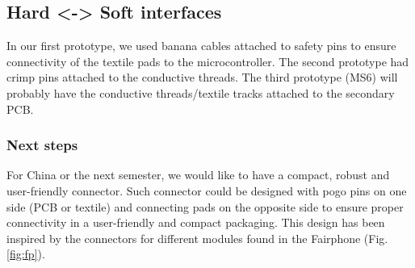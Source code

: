 \subsection{Hard <-> Soft interfaces}
In our first prototype, we used banana cables attached to safety pins to ensure connectivity of the textile pads to the microcontroller. The second prototype had crimp pins attached to the conductive threads. The third prototype (MS6) will probably have the conductive threads/textile tracks attached to the secondary PCB.

\subsubsection{Next steps} For China or the next semester, we would like to have a compact, robust and user-friendly connector. Such connector could be designed with pogo pins on one side (PCB or textile) and connecting pads on the opposite side to ensure proper connectivity in a user-friendly and compact packaging. This design has been inspired by the connectors for different modules found in the Fairphone (Fig. \ref{fig:fp}).

